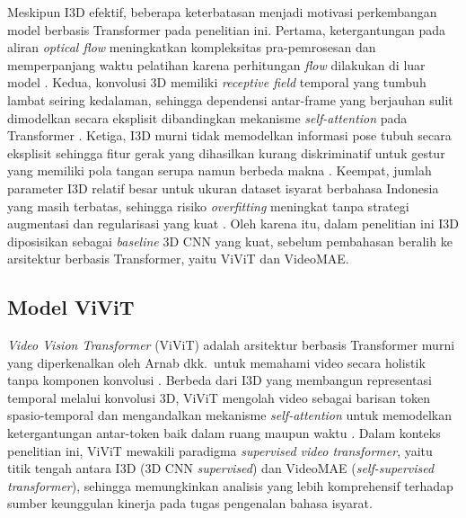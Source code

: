 Meskipun I3D efektif, beberapa keterbatasan menjadi motivasi perkembangan model berbasis Transformer pada penelitian ini. Pertama, ketergantungan pada aliran \textit{optical flow} meningkatkan kompleksitas pra-pemrosesan dan memperpanjang waktu pelatihan karena perhitungan \textit{flow} dilakukan di luar model \cite{Simonyan2014TwoStream,Carreira2017I3D}. Kedua, konvolusi 3D memiliki \textit{receptive field} temporal yang tumbuh lambat seiring kedalaman, sehingga dependensi antar-frame yang berjauhan sulit dimodelkan secara eksplisit dibandingkan mekanisme \textit{self-attention} pada Transformer \cite{Vaswani2023,Arnab2021}. Ketiga, I3D murni tidak memodelkan informasi pose tubuh secara eksplisit sehingga fitur gerak yang dihasilkan kurang diskriminatif untuk gestur yang memiliki pola tangan serupa namun berbeda makna \cite{Carreira2017I3D}. Keempat, jumlah parameter I3D relatif besar untuk ukuran dataset isyarat berbahasa Indonesia yang masih terbatas, sehingga risiko \textit{overfitting} meningkat tanpa strategi augmentasi dan regularisasi yang kuat \cite{Carreira2017I3D,Li2020WLASL}. Oleh karena itu, dalam penelitian ini I3D diposisikan sebagai \textit{baseline} 3D CNN yang kuat, sebelum pembahasan beralih ke arsitektur berbasis Transformer, yaitu ViViT dan VideoMAE.\par

\subsection{Model ViViT} \label{II.ViViT}
\textit{Video Vision Transformer} (ViViT) adalah arsitektur berbasis Transformer murni yang diperkenalkan oleh Arnab dkk.\ untuk memahami video secara holistik tanpa komponen konvolusi \cite{Arnab2021}. Berbeda dari I3D yang membangun representasi temporal melalui konvolusi 3D, ViViT mengolah video sebagai barisan token spasio-temporal dan mengandalkan mekanisme \textit{self-attention} untuk memodelkan ketergantungan antar-token baik dalam ruang maupun waktu \cite{Arnab2021}. Dalam konteks penelitian ini, ViViT mewakili paradigma \textit{supervised video transformer}, yaitu titik tengah antara I3D (3D CNN \textit{supervised}) dan VideoMAE (\textit{self-supervised transformer}), sehingga memungkinkan analisis yang lebih komprehensif terhadap sumber keunggulan kinerja pada tugas pengenalan bahasa isyarat.\par

